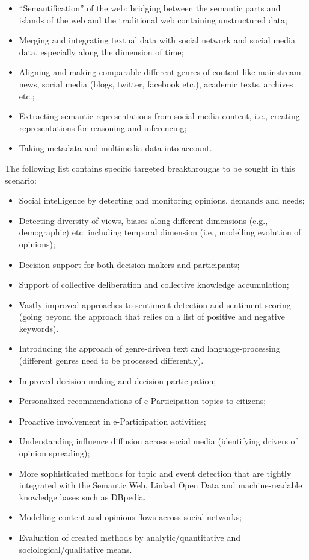 \documentclass[10pt, plain]{../../metanetpaper}
\begin{document}
\begin{multicols}{2}
\begin{itemize}
\item “Semantification” of the web: bridging between the semantic parts and islands of the web and the traditional web containing unstructured data;
\item Merging and integrating textual data with social network and social media data, especially along the dimension of time;
\item Aligning and making comparable different genres of content like mainstream-news, social media (blogs, twitter, facebook etc.), academic texts, archives etc.;
\item Extracting semantic representations from social media content, i.e., creating representations for reasoning and inferencing;
\item Taking metadata and multimedia data into account.
\end{itemize}

The following list contains specific targeted breakthroughs to be sought in this scenario:

\begin{itemize}
\item Social intelligence by detecting and monitoring opinions, demands and needs;
\item Detecting diversity of views, biases along different dimensions (e.g., demographic) etc. including temporal dimension (i.e., modelling evolution of opinions);
\item Decision support for both decision makers and participants;
\item Support of collective deliberation and collective knowledge accumulation;
\item Vastly improved approaches to sentiment detection and sentiment scoring (going beyond the approach that relies on a list of positive and negative keywords).
\item Introducing the approach of genre-driven text and language-processing (different genres need to be processed differently).
\item Improved decision making and decision participation;
\item Personalized recommendations of e-Participation topics to citizens;
\item Proactive involvement in e-Participation activities;
\item Understanding influence diffusion across social media (identifying drivers of opinion spreading);
\item 	More sophisticated methods for topic and event detection that are tightly integrated with the Semantic Web, Linked Open Data and machine-readable knowledge bases such as DBpedia.
\item Modelling content and opinions flows across social networks;
\item Evaluation of created methods by analytic/quantitative and sociological/qualitative means.
\end{itemize}


\end{multicols}
\end{document}
